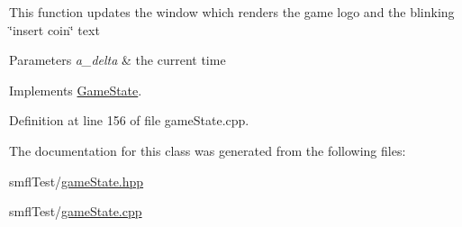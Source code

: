 This function updates the window which renders the game logo and the blinking \char`\"{}insert coin\char`\"{} text


\begin{DoxyParams}{Parameters}
{\em a\+\_\+delta} & the current time \\
\hline
\end{DoxyParams}


Implements \hyperlink{class_game_state_ab1fe4312f7ce88e7dc11f9935dee67d1}{Game\+State}.



Definition at line 156 of file game\+State.\+cpp.



The documentation for this class was generated from the following files\+:\begin{DoxyCompactItemize}
\item 
smfl\+Test/\hyperlink{game_state_8hpp}{game\+State.\+hpp}\item 
smfl\+Test/\hyperlink{game_state_8cpp}{game\+State.\+cpp}\end{DoxyCompactItemize}
